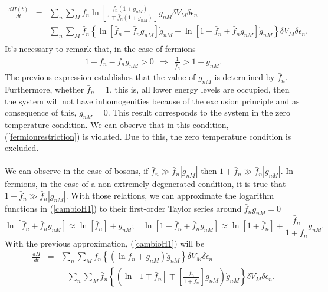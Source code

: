 \documentclass{article}
\begin{document}
\begin{eqnarray}
    \frac{dH(t)}{dt}&=&\sum_n \sum_M \bar{f}_{n}\ln \left[ \frac{\bar{f}_{n}(1+g_{nM})}{1\mp \bar{f}_{n} (1+ g_{nM})} \right]\dot{g}_{nM}\delta V_M \delta \epsilon_n \nonumber \\
    &=&\sum_n \sum_M \bar{f}_n \left \{ \ln [\bar{f}_n+\bar{f}_n g_{nM}]\dot{g}_{nM}-\ln [1\mp\bar{f}_n\mp\bar{f}_n g_{nM}]\dot{g}_{nM}  \right \}\delta V_M \delta \epsilon_n.\nonumber \\
    \label{cambioH1}
\end{eqnarray}{}
It's necessary to remark that, in the case of fermions
\begin{eqnarray}
   1-\bar f_n -\bar f_n g_{nM}>0 \ \ \Rightarrow \ \ \frac{1}{\bar f_n}>1+g_{nM}. \label{fermionrestriction}
\end{eqnarray}{}
The previous expression establishes that the value of $g_{nM}$ is determined by $\bar f_n$. Furthermore, whether $\bar f_{n}=1$, this is, all lower energy levels are occupied, then the system will not have inhomogenities because of the exclusion principle and as consequence of this,  $g_{nM}=0$. This result corresponds to the system in the zero temperature condition. We can observe that in this condition, (\ref{fermionrestriction}) is violated. Due to this, the zero temperature condition is excluded.\\
\\
We can observe in the case of bosons, if $\bar{f}_n \gg \bar{f}_n |g_{nM}|$ then $1+\bar{f}_n \gg \bar{f}_n |g_{nM}|$. In fermions, in the case of a non-extremely degenerated condition, it is true that $1-\bar{f}_n \gg \bar{f}_n |g_{nM}|$. With those relations, we can approximate the logarithm functions in (\ref{cambioH1}) to their first-order Taylor series around $\bar f_n g_{nM}=0$ 
\begin{equation}
    \ln [\bar{f}_n+\bar{f}_n g_{nM}] \approx \ln [\bar{f}_n]+ g_{nM}; \ \ \ \ \ln[1\mp\bar{f}_n\mp\bar{f}_n g_{nM}] \approx \ln[1\mp\bar{f}_n]\mp\frac{\bar{f}_n}{1\mp\bar{f}_{n}} g_{nM}. \label{lnapproximation}
\end{equation}{}
With the previous approximation, (\ref{cambioH1}) will be
\begin{eqnarray}
    \frac{dH}{dt}&=&\sum_n \sum_M \bar{f}_n\left \{ (\ln \bar{f}_n+ g_{nM})\dot{g}_{nM}\right\}\delta V_M \delta \epsilon_n \nonumber \\
    &&-\sum_{n}\sum_{M}\bar f_n\left\{ \left( \ln[1\mp\bar{f}_n]\mp \left[\frac{\bar{f}_n}{1\mp\bar{f}_n} \right] g_{nM}\right)\dot{g}_{nM} \right \}\delta V_M \delta \epsilon_n.\label{cambioH2}
\end{eqnarray}{}
\end{document}
